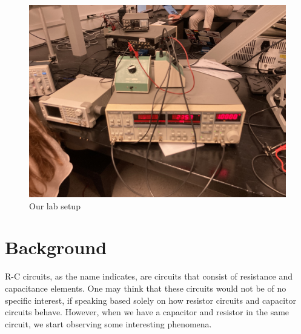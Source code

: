 \documentclass[twocolumn]{article}\usepackage[english]{babel}
\begin{document}
\begin{figure}
  \includegraphics[width=\linewidth]{images/lab/setup.JPEG}
  \caption{Our lab setup}
  \label{fig:LAB_SETUP}
\end{figure}

\section{Background}
R-C circuits, as the name indicates, are circuits that consist of resistance and capacitance elements. One may think that these circuits would not be of no specific interest, if speaking based solely on how resistor circuits and capacitor circuits behave. However, when we have a capacitor and resistor in the same circuit, we start observing some interesting phenomena. 
\newline
\newline
{}
 
\end{document}
